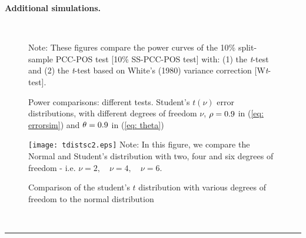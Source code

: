 \documentclass[harvard,11pt]{article}
\newenvironment{proof}[1][Proof]{\textbf{#1.} }{\  \rule{0.5em}{0.5em}}
\begin{document}
\begin{proof}[Additional simulations]
\begin{figure}[tbph]
\caption{Power comparisons: different tests. Student's $t(\nu)$ error distributions, with
different degrees of freedom $\nu$, $\protect\rho=0.9$ in (\protect\ref{eq: errorsim}) and $\protect%
\theta =0.9$ in (\protect\ref{eq: theta})}
\begin{center}
 \\[0pt]
\end{center}
\doublespacing
Note: These figures compare the power curves of the 10\% split-sample PCC-POS test
[10\% SS-PCC-POS test] with: (1) the \textit{t}-test and (2) the \textit{t}-test based
on White's (1980) variance correction [W\textit{t}-test]. 
\label{fig: c24}
\end{figure}
\FloatBarrier
\begin{figure}
\caption{Comparison of the student's $t$ distribution with various degrees of freedom to the normal distribution}
\texttt{[image: tdistsc2.eps]}\label{fig: distos1}
Note: In this figure, we compare the Normal and Student's distribution with two, four and six degrees of freedom - i.e. $\nu=2,\quad \nu=4,\quad \nu=6$.
\label{fig: c25}
\end{figure}
\FloatBarrier
\end{proof}
\newpage


\end{document}
